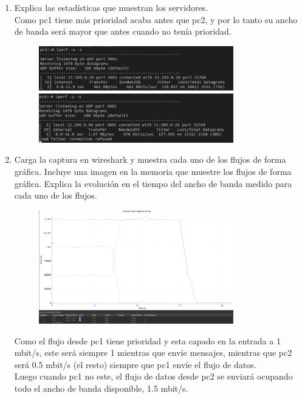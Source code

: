 \documentclass[12pt, a4paper]{report}
\begin{document}
\begin{enumerate}
	\item Explica las estadísticas que muestran los servidores.\\
	
	Como pc1 tiene más prioridad acaba antes que pc2, y por lo tanto su ancho de banda será mayor que antes cuando no tenía prioridad.
	\begin{figure}[H]
		\centering
		\includegraphics[width=0.8\textwidth]{ej1.3.2_1_a}
		\includegraphics[width=0.8\textwidth]{ej1.3.2_1_b}
	\end{figure}
	\item Carga la captura en wireshark y muestra cada uno de los flujos de forma gráfica. Incluye una
	imagen en la memoria que muestre los flujos de forma gráfica. Explica la evolución en el tiempo
	del ancho de banda medido para cada uno de los flujos.
	\begin{figure}[H]
		\centering
		\includegraphics[width=0.8\textwidth]{ej1.3.2_2}
	\end{figure}
	Como el flujo desde pc1 tiene prioridad y esta capado en la entrada a 1 mbit/s, este será siempre 1 mientras que envíe mensajes, mientras que pc2 será 0.5 mbit/s (el resto) siempre que pc1 envíe el flujo de datos.\\
	Luego cuando pc1 no este, el flujo de datos desde pc2 se enviará ocupando todo el ancho de banda disponible, 1.5 mbit/s.
\end{enumerate}
\end{document}
